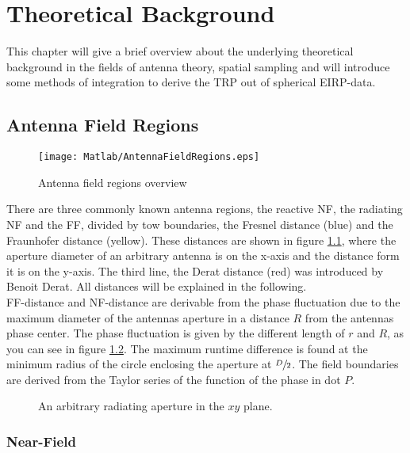 \chapter{Theoretical Background}

This chapter will give a brief overview about the underlying theoretical background in the fields of antenna theory, spatial sampling and will introduce some methods of integration to derive the \ac{TRP} out of spherical \ac{EIRP}-data.

\section{Antenna Field Regions}

\begin{figure}[H]
\centering
\texttt{[image: Matlab/AntennaFieldRegions.eps]}
\caption{Antenna field regions overview}
\label{fig:antennafieldreg}
\end{figure}

There are three commonly known antenna regions, the reactive \ac{NF}, the radiating \ac{NF} and the \ac{FF}, divided by tow boundaries, the Fresnel distance (blue) and the Fraunhofer distance (yellow). These distances are shown in figure \ref{fig:antennafieldreg}, where the aperture diameter of an arbitrary antenna is on the x-axis and the distance form it is on the y-axis. The third line, the Derat distance (red) was introduced by Benoit Derat. \cite{8393926} All distances will be explained in the following.\\
\ac{FF}-distance and \ac{NF}-distance are derivable from the phase fluctuation due to the maximum diameter of the antennas aperture \cite{7942128} in a distance $R$ from the antennas phase center. The phase fluctuation is given by the different length of $r$ and $R$, as you can see in figure \ref{fig:arbaperturexy}. The maximum runtime difference is found at the minimum radius of the circle enclosing the aperture at $\sfrac{D}{2}$. The field boundaries are derived from the Taylor series of the function of the phase in dot $P$. \cite{7942128}

\begin{figure}[H]
\centering
\def\svgwidth{0.6\textwidth}

\caption{An arbitrary radiating aperture in the $xy$ plane. \cite{7942128}}
\label{fig:arbaperturexy}
\end{figure}

\subsection{Near-Field}

